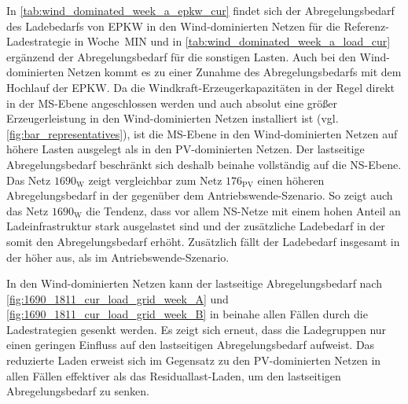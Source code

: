 



In \autoref{tab:wind_dominated_week_a_epkw_cur} findet sich der Abregelungsbedarf des Ladebedarfs von \gls{EPKW} in den Wind-dominierten Netzen für die Referenz-Ladestrategie in Woche~MIN und in \autoref{tab:wind_dominated_week_a_load_cur} ergänzend der Abregelungsbedarf für die sonstigen Lasten.
Auch bei den Wind-dominierten Netzen kommt es zu einer Zunahme des Abregelungsbedarfs mit dem Hochlauf der \gls{EPKW}.
Da die Windkraft-Erzeugerkapazitäten in der Regel direkt in der \gls{MS}-Ebene angeschlossen werden und auch absolut eine größer Erzeugerleistung in den Wind-dominierten Netzen installiert ist (vgl. \autoref{fig:bar_representatives}), ist die \gls{MS}-Ebene in den Wind-dominierten Netzen auf höhere Lasten ausgelegt als in den \gls{PV}-dominierten Netzen.
Der lastseitige Abregelungsbedarf beschränkt sich deshalb beinahe vollständig auf die \gls{NS}-Ebene.
Das Netz \(1690_{\text{W}}\) zeigt vergleichbar zum Netz \(176_{\text{PV}}\) einen höheren Abregelungsbedarf in der \SzeFirmenparkplatz gegenüber dem Antriebswende-Szenario.
So zeigt auch das Netz \(1690_{\text{W}}\) die Tendenz, dass vor allem \gls{NS}-Netze mit einem hohen Anteil an Ladeinfrastruktur \zH stark ausgelastet sind und der zusätzliche Ladebedarf \zH in der \SzeFirmenparkplatz somit den Abregelungsbedarf erhöht.
Zusätzlich fällt der Ladebedarf insgesamt in der \SzeFirmenparkplatz höher aus, als im Antriebswende-Szenario.





In den Wind-dominierten Netzen kann der lastseitige Abregelungsbedarf nach \autoref{fig:1690_1811_cur_load_grid_week_A} und \autoref{fig:1690_1811_cur_load_grid_week_B} in beinahe allen Fällen durch die Ladestrategien gesenkt werden.
Es zeigt sich erneut, dass die Ladegruppen nur einen geringen Einfluss auf den lastseitigen Abregelungsbedarf aufweist.
Das reduzierte Laden erweist sich im Gegensatz zu den \gls{PV}-dominierten Netzen in allen Fällen effektiver als das Residuallast-Laden, um den lastseitigen Abregelungsbedarf zu senken.\medskip



